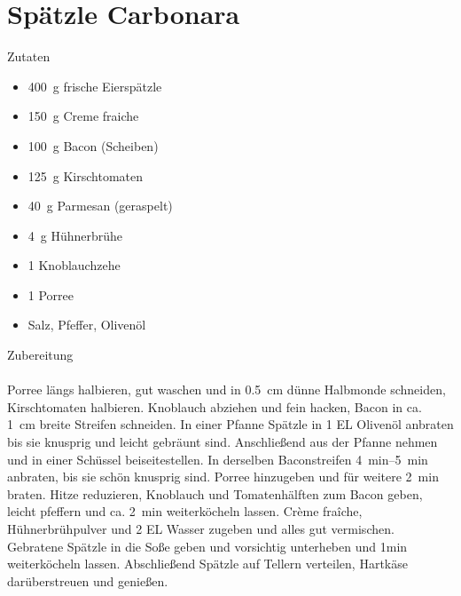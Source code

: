 \section*{Spätzle Carbonara}
\ihead{}\ohead{}
\cfoot{}
{\Large Zutaten}
\begin{multicols}{2}
\begin{itemize}
    \item \SI{400}{g} frische Eierspätzle
    \item \SI{150}{g} Creme fraiche
    \item \SI{100}{g} Bacon (Scheiben)
    \item \SI{125}{g} Kirschtomaten
    \item \SI{40}{g} Parmesan (geraspelt)
    \item \SI{4}{g} Hühnerbrühe
    \item \num{1} Knoblauchzehe
    \item \num{1} Porree
    \item Salz, Pfeffer, Olivenöl 
\end{itemize}
\end{multicols}
\noindent
{\Large Zubereitung}\\
\\
Porree längs halbieren, gut waschen und in \SI{0,5}{cm} dünne Halbmonde schneiden, Kirschtomaten halbieren. 
Knoblauch abziehen und fein hacken, Bacon in ca. \SI{1}{cm} breite Streifen schneiden.
In einer Pfanne Spätzle in \num{1} EL Olivenöl anbraten bis sie knusprig und leicht gebräunt sind. 
Anschließend aus der Pfanne nehmen und in einer Schüssel beiseitestellen.
In derselben Baconstreifen  \SIrange{4}{5}{min} anbraten, bis sie schön knusprig sind. 
Porree hinzugeben und für weitere \SI{2}{min} braten.
Hitze reduzieren, Knoblauch und Tomatenhälften zum Bacon geben, leicht pfeffern und ca. \SI{2}{min} weiterköcheln lassen.
Crème fraîche, Hühnerbrühpulver und \num{2} EL  Wasser zugeben und alles gut vermischen.
Gebratene Spätzle in die Soße geben und vorsichtig unterheben und \num{1}{min} weiterköcheln lassen.
Abschließend Spätzle auf Tellern verteilen, Hartkäse darüberstreuen und genießen.


